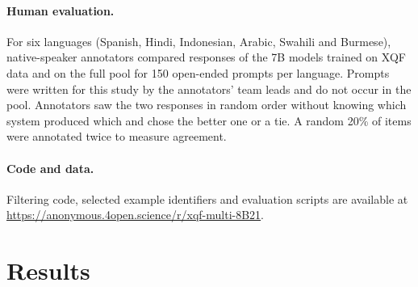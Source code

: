 \documentclass{article}
\begin{document}
\paragraph{Human evaluation.}
For six languages (Spanish, Hindi, Indonesian, Arabic, Swahili and Burmese), native-speaker annotators compared responses of the 7B models trained on XQF data and on the full pool for 150 open-ended prompts per language. Prompts were written for this study by the annotators' team leads and do not occur in the pool. Annotators saw the two responses in random order without knowing which system produced which and chose the better one or a tie. A random 20\% of items were annotated twice to measure agreement.

\paragraph{Code and data.}
Filtering code, selected example identifiers and evaluation scripts are available at \url{https://anonymous.4open.science/r/xqf-multi-8B21}.

\section{Results}
\label{sec:results}
\end{document}
